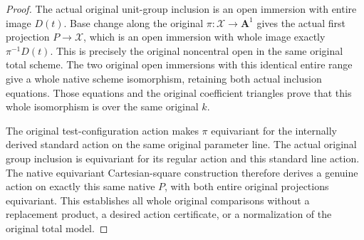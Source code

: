 \begin{proof}
The actual original unit-group inclusion is an open immersion
with entire image $D(t)$. Base change along the original
$\pi:\mathcal X\to\mathbf A^1$ gives the actual first
projection $P\to\mathcal X$, which is an open immersion
with whole image exactly $\pi^{-1}D(t)$.
This is precisely the original noncentral open in the same
original total scheme. The two original open immersions
with this identical entire range give a whole native
scheme isomorphism, retaining both actual inclusion equations.
Those equations and the original coefficient triangles prove
that this whole isomorphism is over the same original $k$.

The original test-configuration action makes $\pi$ equivariant
for the internally derived standard action on the same
original parameter line. The actual original group inclusion
is equivariant for its regular action and this standard line
action. The native equivariant Cartesian-square construction
therefore derives a genuine action on exactly this same
native $P$, with both entire original projections equivariant.
This establishes all whole original comparisons without a
replacement product, a desired action certificate, or a
normalization of the original total model.
\end{proof}
